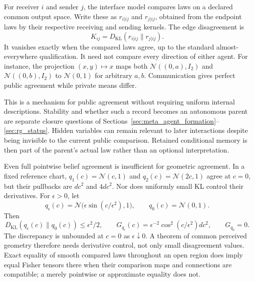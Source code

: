 For receiver $i$ and sender $j$, the interface model compares laws on a declared common output space. Write these as $r_{i|ij}$ and $r_{j|ij}$, obtained from the endpoint laws by their respective receiving and sending kernels. The edge disagreement is
\begin{equation}
K_{ij}=D_{\mathrm{KL}}(r_{i|ij}\|r_{j|ij}).
\label{eq:operational_agreement}
\end{equation}
It vanishes exactly when the compared laws agree, up to the standard almost-everywhere qualification. It need not compare every direction of either agent. For instance, the projection $(x,y)\mapsto x$ maps both $\mathcal N((0,a),I_2)$ and $\mathcal N((0,b),I_2)$ to $\mathcal N(0,1)$ for arbitrary $a,b$. Communication gives perfect public agreement while private means differ.

This is a mechanism for public agreement without requiring uniform internal descriptions. Stability and whether such a record becomes an autonomous parent are separate closure questions of Sections~\ref{sec:meta_agent_formation}--\ref{sec:rg_status}. Hidden variables can remain relevant to later interactions despite being invisible to the current public comparison. Retained conditional memory is then part of the parent's actual law rather than an optional interpretation.

Even full pointwise belief agreement is insufficient for geometric agreement. In a fixed reference chart, $q_1(c)=\mathcal N(c,1)$ and $q_2(c)=\mathcal N(2c,1)$ agree at $c=0$, but their pullbacks are $dc^2$ and $4dc^2$. Nor does uniformly small KL control their derivatives. For $\epsilon>0$, let
\begin{equation}
q_\epsilon(c)=\mathcal N\bigl(\epsilon\sin(c/\epsilon^2),1\bigr),\qquad q_0(c)=\mathcal N(0,1).
\end{equation}
Then
\begin{equation}
D_{\mathrm{KL}}(q_\epsilon(c)\|q_0(c))\leq\epsilon^2/2,
\qquad
G_{q_\epsilon}(c)=\epsilon^{-2}\cos^2(c/\epsilon^2)dc^2,
\qquad G_{q_0}=0.
\label{eq:agreement_geometry_counterexample}
\end{equation}
The discrepancy is unbounded at $c=0$ as $\epsilon\downarrow0$. A theorem of common perceived geometry therefore needs derivative control, not only small disagreement values. Exact equality of smooth compared laws throughout an open region does imply equal Fisher tensors there when their comparison maps and connections are compatible; a merely pointwise or approximate equality does not.

